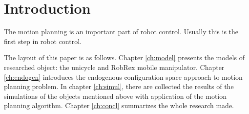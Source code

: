 \chapter{Introduction}
The motion planning is an important part of robot control. Usually this is the first step
in robot control. 

The layout of this paper is as follows. Chapter \ref{ch:model} presents the models of researched
object: the unicycle and RobRex mobile manipulator. Chapter \ref{ch:endogen} introduces the endogenous
configuration space approach to motion planning problem. In chapter \ref{ch:simul}, there are collected
the results of the simulations of the objects mentioned above with application of the motion
planning algorithm. Chapter \ref{ch:concl} summarizes the whole research made.